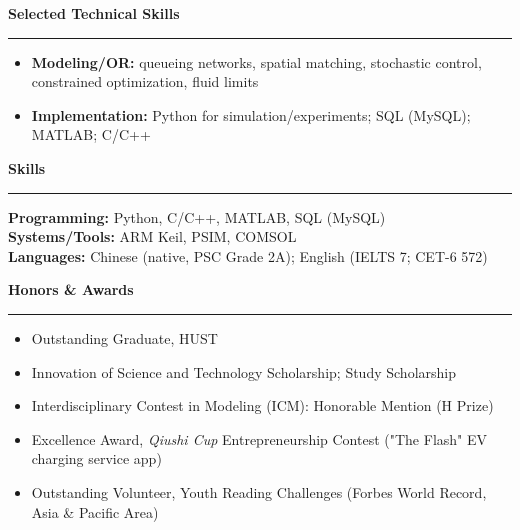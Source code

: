 \documentclass[11pt,a4paper]{article}
\newcommand{\cvsection}[1]{\vspace{2pt}\noindent\textbf{\large #1}\\[-2pt]\textcolor{cvgray}{\rule{\linewidth}{0.4pt}}\vspace{2pt}}
\begin{document}
\cvsection{Selected Technical Skills}
\begin{itemize}
  \item \textbf{Modeling/OR:} queueing networks, spatial matching, stochastic control, constrained optimization, fluid limits
  \item \textbf{Implementation:} Python for simulation/experiments; SQL (MySQL); MATLAB; C/C++
\end{itemize}

\cvsection{Skills}
\textbf{Programming:} Python, C/C++, MATLAB, SQL (MySQL)\\
\textbf{Systems/Tools:} ARM Keil, PSIM, COMSOL\\
\textbf{Languages:} Chinese (native, PSC Grade 2A); English (IELTS 7; CET-6 572)

\cvsection{Honors \& Awards}
\begin{itemize}
  \item Outstanding Graduate, HUST
  \item Innovation of Science and Technology Scholarship; Study Scholarship
  \item Interdisciplinary Contest in Modeling (ICM): Honorable Mention (H Prize)
  \item Excellence Award, \emph{Qiushi Cup} Entrepreneurship Contest ("The Flash" EV charging service app)
  \item Outstanding Volunteer, Youth Reading Challenges (Forbes World Record, Asia \& Pacific Area)
\end{itemize}
\end{document}
